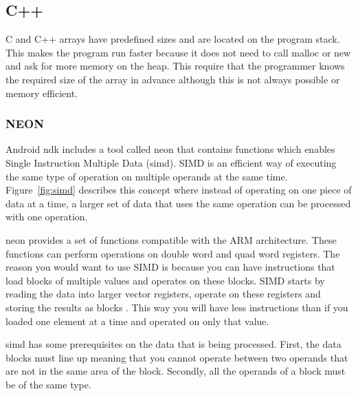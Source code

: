 \subsection{C++}
C and C++ arrays have predefined sizes and are located on the program stack. This makes the program run faster because it does not need to call malloc or new and ask for more memory on the heap. This require that the programmer knows the required size of the array in advance although this is not always possible or memory efficient.

\subsubsection{NEON}
Android \gls{ndk} includes a tool called \gls{neon} that contains functions which enables Single Instruction Multiple Data (\gls{simd}). SIMD is an efficient way of executing the same type of operation on multiple operands at the same time. Figure~\ref{fig:simd} describes this concept where instead of operating on one piece of data at a time, a larger set of data that uses the same operation can be processed with one operation.

\gls{neon} provides a set of functions compatible with the ARM architecture. These functions can perform operations on double word and quad word registers. The reason you would want to use SIMD is because you can have instructions that load blocks of multiple values and operates on these blocks. SIMD starts by reading the data into larger vector registers, operate on these registers and storing the results as blocks \cite{simd:expl}. This way you will have less instructions than if you loaded one element at a time and operated on only that value.

\gls{simd} has some prerequisites on the data that is being processed. First, the data blocks must line up meaning that you cannot operate between two operands that are not in the same area of the block. Secondly, all the operands of a block must be of the same type.

